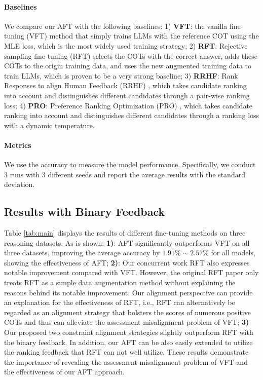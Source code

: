 \paragraph{Baselines}

We compare our AFT with the following baselines: 1) \textbf{VFT}: the vanilla fine-tuning (VFT) method that simply trains LLMs with the reference COT using the MLE loss, which is the most widely used training strategy; 2) \textbf{RFT}: Rejective sampling fine-tuning (RFT) \citep{rft} selects the COTs with the correct answer, adds these COTs to the origin training data, and uses the new augmented training data to train LLMs, which is proven to be a very strong baseline; 3) \textbf{RRHF}: Rank Responses to align Human Feedback (RRHF) \citep{yuan2023rrhf}, which takes candidate ranking into account and distinguishes different candidates through a pair-wise ranking loss; 4) \textbf{PRO}: Preference Ranking Optimization (PRO) \citep{song2023preference}, which takes candidate ranking into account and distinguishes different candidates through a ranking loss with a dynamic temperature.

\paragraph{Metrics} We use the accuracy to measure the model performance. Specifically, we conduct $3$ runs with $3$ different seeds and report the average results with the standard deviation.

\subsection{Results with Binary Feedback}

Table \ref{tab:main} displays the results of different fine-tuning methods on three reasoning datasets. As is shown:
\textbf{1)}: AFT significantly outperforms VFT on all three datasets, improving the average accuracy by $1.91\% \sim 2.57\%$ for all models,  showing the effectiveness of AFT;
\textbf{2)}: Our concurrent work RFT also expresses notable improvement compared with VFT. However, the original RFT paper only treats RFT as a simple data augmentation method without explaining the reasons behind its notable improvement. Our alignment perspective can provide an explanation for the effectiveness of RFT, i.e., RFT can alternatively be regarded as an alignment strategy that bolsters the scores of numerous positive COTs and thus can alleviate the assessment misalignment problem of VFT;
\textbf{3)} Our proposed two constraint alignment strategies slightly outperform RFT with the binary feedback. In addition, our AFT can be also easily extended to utilize the ranking feedback that RFT can not well utilize. These results demonstrate the importance of revealing the assessment misalignment problem of VFT and the effectiveness of our AFT approach.

